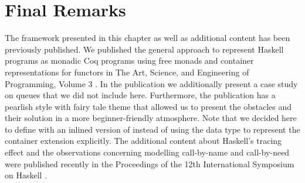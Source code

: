\section{Final Remarks}

The framework presented in this chapter as well as additional content
has been previously published.
We published the general approach to represent Haskell programs as
monadic Coq programs using free monads and container representations
for functors in The Art, Science, and Engineering of Programming,
Volume 3 \citep{dylus2019one}.
In the publication we additionally present a case study on queues
that we did not include here.
Furthermore, the publication has a pearlish style with fairy tale
theme that allowed us to present the obstacles and their solution in a
more beginner-friendly atmosphere.
Note that we decided here to define  with an inlined
version of  instead of using the data type to represent the
container extension explicitly.
The additional content about Haskell's tracing effect and the
observations concerning modelling call-by-name and call-by-need were
published recently in the Proceedings of the 12th International
Symposium on Haskell \citep{christiansen2019verifying}. 